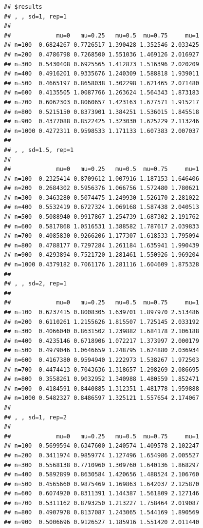 \documentclass[11pt,a4paper]{article}
\begin{document}
\begin{verbatim}
## $results
## , , sd=1, rep=1
## 
##             mu=0   mu=0.25   mu=0.5  mu=0.75     mu=1
## n=100  0.6824267 0.7726517 1.390428 1.352546 2.033425
## n=200  0.4786798 0.7268500 1.551036 1.469126 2.016927
## n=300  0.5430408 0.6925565 1.412873 1.516396 2.020209
## n=400  0.4916201 0.9335676 1.240309 1.588818 1.939011
## n=500  0.4665197 0.8658038 1.302298 1.621465 2.071480
## n=600  0.4135505 1.0087766 1.263624 1.564343 1.873183
## n=700  0.6062303 0.8060657 1.423163 1.677571 1.915217
## n=800  0.5215150 0.8373901 1.384251 1.536015 1.845518
## n=900  0.4377088 0.8522425 1.323030 1.625229 2.113246
## n=1000 0.4272311 0.9598533 1.171133 1.607383 2.007037
## 
## , , sd=1.5, rep=1
## 
##             mu=0   mu=0.25   mu=0.5  mu=0.75     mu=1
## n=100  0.2325414 0.8709612 1.007916 1.187153 1.646406
## n=200  0.2684302 0.5956376 1.066756 1.572480 1.780621
## n=300  0.3463280 0.5074475 1.249930 1.526170 2.281022
## n=400  0.5532419 0.6727324 1.069168 1.587438 2.040513
## n=500  0.5088940 0.9917867 1.254739 1.687302 2.191762
## n=600  0.5817868 1.0516531 1.388582 1.787617 2.039833
## n=700  0.4085830 0.9266206 1.177307 1.618533 1.795094
## n=800  0.4788177 0.7297284 1.261184 1.635941 1.990439
## n=900  0.4293894 0.7521720 1.281461 1.550926 1.969204
## n=1000 0.4379182 0.7061176 1.281116 1.604609 1.875328
## 
## , , sd=2, rep=1
## 
##             mu=0   mu=0.25   mu=0.5  mu=0.75     mu=1
## n=100  0.6237415 0.8008305 1.639701 1.897970 2.513486
## n=200  0.6110261 1.2155626 1.815507 1.725145 2.033192
## n=300  0.4066040 0.8631502 1.239882 1.684178 2.106188
## n=400  0.4235146 0.6718906 1.072217 1.373997 2.000179
## n=500  0.4979046 1.0646659 1.248795 1.624880 2.036934
## n=600  0.4167380 0.9594940 1.222973 1.538267 1.972503
## n=700  0.4474413 0.7043636 1.318657 1.298269 2.086695
## n=800  0.3558261 0.9032952 1.340988 1.480559 1.852471
## n=900  0.4184591 0.8440885 1.312351 1.481778 1.959888
## n=1000 0.5482327 0.8486597 1.325121 1.557654 2.174067
## 
## , , sd=1, rep=2
## 
##             mu=0   mu=0.25   mu=0.5  mu=0.75     mu=1
## n=100  0.5699594 0.6347600 1.240574 1.409578 2.102247
## n=200  0.3411974 0.9859774 1.127496 1.654986 2.005527
## n=300  0.5568138 0.7710960 1.309760 1.640136 1.868297
## n=400  0.5892899 0.8630584 1.420656 1.488524 2.106760
## n=500  0.4565660 0.9875469 1.169863 1.642037 2.125870
## n=600  0.6074920 0.8311391 1.144387 1.561809 2.127146
## n=700  0.5311162 0.8793250 1.213227 1.758464 2.019087
## n=800  0.4907978 0.8137087 1.243065 1.544169 1.890569
## n=900  0.5006696 0.9126527 1.185916 1.551420 2.011440

\end{verbatim}
\end{document}
